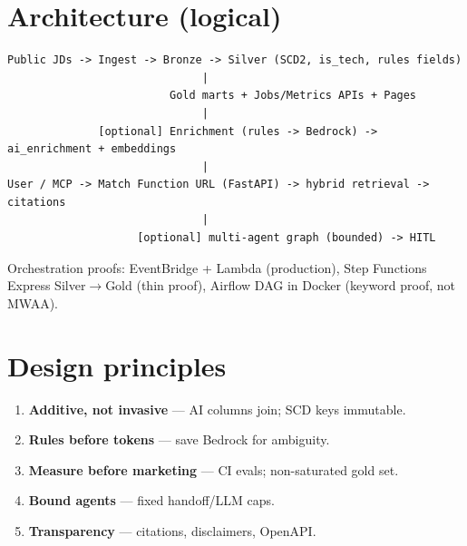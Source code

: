 \section{Architecture (logical)}
\label{sec:architecture}

\begin{lstlisting}[caption={Logical architecture of the AI integration layer},label={lst:arch}]
Public JDs -> Ingest -> Bronze -> Silver (SCD2, is_tech, rules fields)
                              |
                         Gold marts + Jobs/Metrics APIs + Pages
                              |
              [optional] Enrichment (rules -> Bedrock) -> ai_enrichment + embeddings
                              |
User / MCP -> Match Function URL (FastAPI) -> hybrid retrieval -> citations
                              |
                    [optional] multi-agent graph (bounded) -> HITL
\end{lstlisting}

Orchestration proofs: EventBridge + Lambda (production), Step Functions Express Silver$\rightarrow$Gold (thin proof), Airflow DAG in Docker (keyword proof, not MWAA).

\section{Design principles}

\begin{enumerate}[leftmargin=*]
  \item \textbf{Additive, not invasive} --- AI columns join; SCD keys immutable.
  \item \textbf{Rules before tokens} --- save Bedrock for ambiguity.
  \item \textbf{Measure before marketing} --- CI evals; non-saturated gold set.
  \item \textbf{Bound agents} --- fixed handoff/LLM caps.
  \item \textbf{Transparency} --- citations, disclaimers, OpenAPI.
\end{enumerate}
